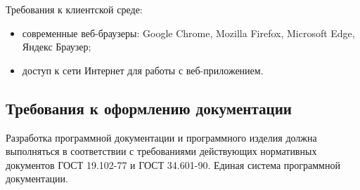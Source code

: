 Требования к клиентской среде:
\begin{itemize}
\item современные веб-браузеры: Google Chrome, Mozilla Firefox, Microsoft Edge, Яндекс Браузер;
\item доступ к сети Интернет для работы с веб-приложением.
\end{itemize}

\subsection{Требования к оформлению документации}

Разработка программной документации и программного изделия должна выполняться в соответствии с требованиями действующих нормативных документов ГОСТ 19.102-77 и ГОСТ 34.601-90. Единая система программной документации.

